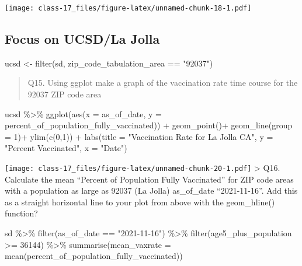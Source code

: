 \documentclass[
]{article}
\newenvironment{Shaded}{\begin{snugshade}}{\end{snugshade}}
\newcommand{\AttributeTok}[1]{\textcolor[rgb]{0.77,0.63,0.00}{#1}}
\newcommand{\DecValTok}[1]{\textcolor[rgb]{0.00,0.00,0.81}{#1}}
\newcommand{\FunctionTok}[1]{\textcolor[rgb]{0.00,0.00,0.00}{#1}}
\newcommand{\NormalTok}[1]{#1}
\newcommand{\OtherTok}[1]{\textcolor[rgb]{0.56,0.35,0.01}{#1}}
\newcommand{\SpecialCharTok}[1]{\textcolor[rgb]{0.00,0.00,0.00}{#1}}
\newcommand{\StringTok}[1]{\textcolor[rgb]{0.31,0.60,0.02}{#1}}
\begin{document}
\texttt{[image: class-17\_files/figure-latex/unnamed-chunk-18-1.pdf]}

\hypertarget{focus-on-ucsdla-jolla}{%
\subsection{Focus on UCSD/La Jolla}\label{focus-on-ucsdla-jolla}}

\begin{Shaded}
\begin{Highlighting}[]
\NormalTok{ucsd }\OtherTok{\textless{}{-}} \FunctionTok{filter}\NormalTok{(sd, zip\_code\_tabulation\_area }\SpecialCharTok{==} \StringTok{"92037"}\NormalTok{)}
\end{Highlighting}
\end{Shaded}

\begin{quote}
Q15. Using ggplot make a graph of the vaccination rate time course for
the 92037 ZIP code area
\end{quote}

\begin{Shaded}
\begin{Highlighting}[]
\NormalTok{ucsd }\SpecialCharTok{\%\textgreater{}\%} 
  \FunctionTok{ggplot}\NormalTok{(}\FunctionTok{aes}\NormalTok{(}\AttributeTok{x =}\NormalTok{ as\_of\_date, }\AttributeTok{y =}\NormalTok{ percent\_of\_population\_fully\_vaccinated)) }\SpecialCharTok{+}
  \FunctionTok{geom\_point}\NormalTok{()}\SpecialCharTok{+}
  \FunctionTok{geom\_line}\NormalTok{(}\AttributeTok{group =} \DecValTok{1}\NormalTok{)}\SpecialCharTok{+}
  \FunctionTok{ylim}\NormalTok{(}\FunctionTok{c}\NormalTok{(}\DecValTok{0}\NormalTok{,}\DecValTok{1}\NormalTok{)) }\SpecialCharTok{+}
  \FunctionTok{labs}\NormalTok{(}\AttributeTok{title =} \StringTok{"Vaccination Rate for La Jolla CA"}\NormalTok{, }\AttributeTok{y =} \StringTok{"Percent Vaccinated"}\NormalTok{, }\AttributeTok{x =} \StringTok{"Date"}\NormalTok{)}
\end{Highlighting}
\end{Shaded}

\texttt{[image: class-17\_files/figure-latex/unnamed-chunk-20-1.pdf]}
\textgreater{} Q16. Calculate the mean ``Percent of Population Fully
Vaccinated'' for ZIP code areas with a population as large as 92037 (La
Jolla) as\_of\_date ``2021-11-16''. Add this as a straight horizontal
line to your plot from above with the geom\_hline() function?

\begin{Shaded}
\begin{Highlighting}[]
\NormalTok{sd }\SpecialCharTok{\%\textgreater{}\%} 
  \FunctionTok{filter}\NormalTok{(as\_of\_date }\SpecialCharTok{==} \StringTok{"2021{-}11{-}16"}\NormalTok{) }\SpecialCharTok{\%\textgreater{}\%} 
  \FunctionTok{filter}\NormalTok{(age5\_plus\_population }\SpecialCharTok{\textgreater{}=} \DecValTok{36144}\NormalTok{) }\SpecialCharTok{\%\textgreater{}\%} 
  \FunctionTok{summarise}\NormalTok{(}\AttributeTok{mean\_vaxrate =} \FunctionTok{mean}\NormalTok{(percent\_of\_population\_fully\_vaccinated))}
\end{Highlighting}
\end{Shaded}
\end{document}
